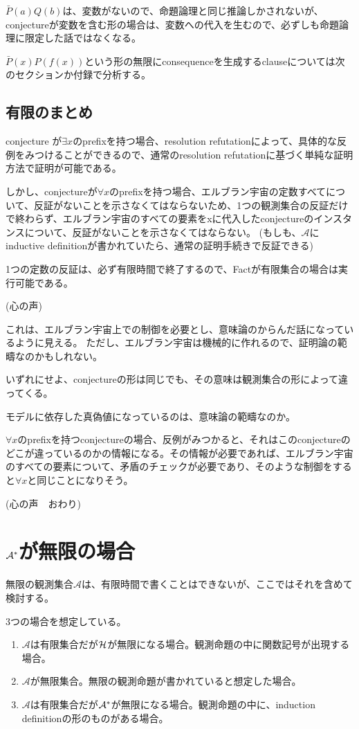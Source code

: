 \documentclass[10pt, oneside]{jarticle}   	%
\begin{document}
$\bar P(a) Q(b)$は、変数がないので、命題論理と同じ推論しかされないが、conjectureが変数を含む形の場合は、変数への代入を生むので、必ずしも命題論理に限定した話ではなくなる。

$\bar P(x) P(f(x))$という形の無限にconsequenceを生成するclauseについては次のセクションか付録で分析する。


\subsection{有限のまとめ}
conjecture が$\exists x $のprefixを持つ場合、resolution refutationによって、具体的な反例をみつけることができるので、通常のresolution refutationに基づく単純な証明方法で証明が可能である。

しかし、conjectureが$\forall x$のprefixを持つ場合、エルブラン宇宙の定数すべてについて、反証がないことを示さなくてはならないため、1つの観測集合の反証だけで終わらず、エルブラン宇宙のすべての要素をxに代入したconjectureのインスタンスについて、反証がないことを示さなくてはならない。
(もしも、$\mathcal{A}$にinductive definitionが書かれていたら、通常の証明手続きで反証できる)

1つの定数の反証は、必ず有限時間で終了するので、Factが有限集合の場合は実行可能である。

(心の声)

これは、エルブラン宇宙上での制御を必要とし、意味論のからんだ話になっているように見える。
ただし、エルブラン宇宙は機械的に作れるので、証明論の範疇なのかもしれない。

いずれにせよ、conjectureの形は同じでも、その意味は観測集合の形によって違ってくる。

モデルに依存した真偽値になっているのは、意味論の範疇なのか。

$\forall x$のprefixを持つconjectureの場合、反例がみつかると、それはこのconjectureのどこが違っているのかの情報になる。その情報が必要であれば、エルブラン宇宙のすべての要素について、矛盾のチェックが必要であり、そのような制御をすると$\forall x$と同じことになりそう。

(心の声　おわり)


\newpage

\section{$\mathcal{A}^{*}$が無限の場合}

無限の観測集合$\mathcal{A}$は、有限時間で書くことはできないが、ここではそれを含めて検討する。

3つの場合を想定している。
\begin{enumerate}
\item $\mathcal{A}$は有限集合だが$\mathcal{H}$が無限になる場合。観測命題の中に関数記号が出現する場合。
\item $\mathcal{A}$が無限集合。無限の観測命題が書かれていると想定した場合。
\item $\mathcal{A}$は有限集合だが$\mathcal{A}^{*}$が無限になる場合。観測命題の中に、induction definitionの形のものがある場合。
\end{enumerate}
\end{document}
